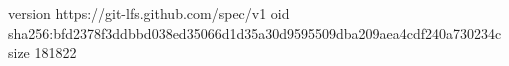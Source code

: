 version https://git-lfs.github.com/spec/v1
oid sha256:bfd2378f3ddbbd038ed35066d1d35a30d9595509dba209aea4cdf240a730234c
size 181822
